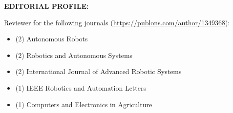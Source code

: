 \item{\bf EDITORIAL PROFILE:}

Reviewer for the following journals (\url{https://publons.com/author/1349368}):
\begin{itemize}
	\item (2) Autonomous Robots
	\item (2) Robotics and Autonomous Systems
	\item (2) International Journal of Advanced Robotic Systems
	\item (1) IEEE Robotics and Automation Letters
	\item (1) Computers and Electronics in Agriculture
\end{itemize}